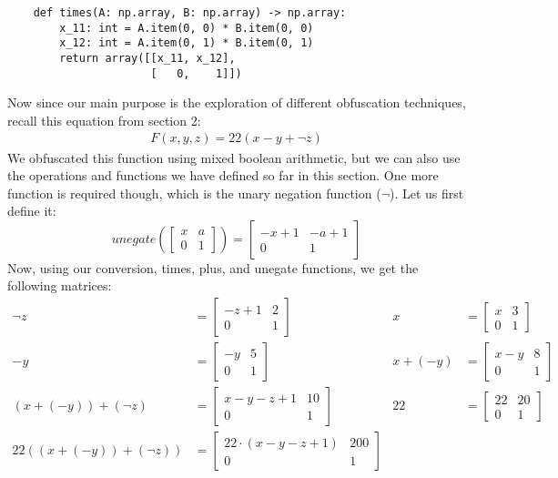 \begin{verbatim}
    def times(A: np.array, B: np.array) -> np.array:
        x_11: int = A.item(0, 0) * B.item(0, 0)
        x_12: int = A.item(0, 1) * B.item(0, 1)
        return array([[x_11, x_12],
                      [   0,    1]])
\end{verbatim}
Now since our main purpose is the exploration of different obfuscation
techniques, recall this equation from section 2:
\begin{align*}
    F(x, y, z) = 22(x - y + \neg z)
\end{align*}
We obfuscated this function using mixed boolean arithmetic, but we can also use
the operations and functions we have defined so far in this section. One more
function is required though, which is the unary negation function ($ \neg $).
Let us first define it:
\begin{equation*}
    unegate\left(
    \begin{bmatrix}
        x & a \\
        0 & 1
    \end{bmatrix}
    \right)
    =
    \begin{bmatrix}
        -x + 1 & -a + 1  \\
        0      & 1
    \end{bmatrix}
\end{equation*}
Now, using our conversion, times, plus, and unegate functions, we get the
following matrices:
\begin{align*}
    \neg z &=
    \begin{bmatrix}
        -z + 1 & 2 \\
        0      & 1
    \end{bmatrix}
    &x &=
    \begin{bmatrix}
        x  &  3 \\
        0  &  1
    \end{bmatrix} \\
    -y & =
    \begin{bmatrix}
        -y & 5\\
        0  & 1
    \end{bmatrix} &
    x + (-y) &=
    \begin{bmatrix}
        x - y & 8 \\
        0      & 1
    \end{bmatrix} \\
     (x + (- y)) + (\neg z) &=
     \begin{bmatrix}
         x - y -z + 1 & 10 \\
         0            & 1
     \end{bmatrix} &
     22 &=
     \begin{bmatrix}
         22 & 20 \\
         0  & 1
     \end{bmatrix} \\
     22((x + (- y)) + (\neg z)) &=
     \begin{bmatrix}
         22 \cdot (x - y -z + 1) & 200 \\
         0 & 1
     \end{bmatrix}
\end{align*}
